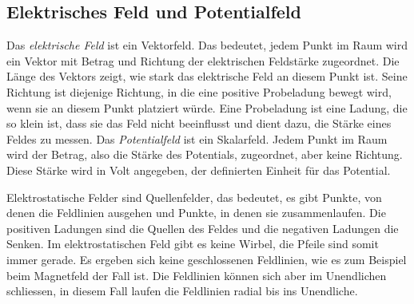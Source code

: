 \subsection{Elektrisches Feld und Potentialfeld
\label{elektro:subsection:VektorSkalar}}
Das \emph{elektrische Feld} ist ein Vektorfeld.
%
%
Das bedeutet, jedem Punkt im Raum wird ein Vektor mit Betrag und Richtung der elektrischen Feldstärke zugeordnet. 
Die Länge des Vektors zeigt, wie stark das elektrische Feld an diesem Punkt ist. 
Seine Richtung ist diejenige Richtung, in die eine positive Probeladung bewegt wird, wenn sie an diesem Punkt platziert würde.
Eine Probeladung ist eine Ladung, die so klein ist, dass sie das Feld nicht beeinflusst und dient dazu, die Stärke eines Feldes zu messen.
Das \emph{Potentialfeld} ist ein Skalarfeld.
%
Jedem Punkt im Raum wird der Betrag, also die Stärke des Potentials, zugeordnet, aber keine Richtung.
Diese Stärke wird in Volt angegeben, der definierten Einheit für das Potential.

Elektrostatische Felder sind Quellenfelder, das bedeutet, es gibt Punkte, von denen die Feldlinien ausgehen und Punkte, in denen sie zusammenlaufen. Die positiven Ladungen sind die Quellen des Feldes und die negativen Ladungen die Senken. 
%
Im elektrostatischen Feld gibt es keine Wirbel, die Pfeile sind somit immer gerade.
Es ergeben sich keine geschlossenen Feldlinien, wie es zum Beispiel beim Magnetfeld der Fall ist.
Die Feldlinien können sich aber im Unendlichen schliessen, in diesem Fall laufen die Feldlinien radial bis ins Unendliche.

